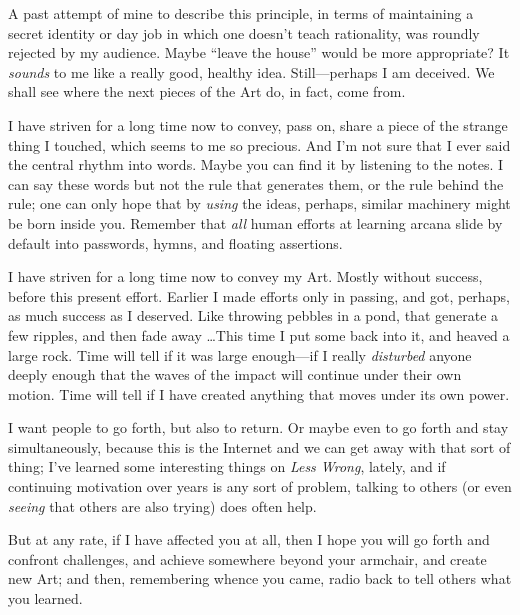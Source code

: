 {
 A past attempt of mine to describe this principle, in terms of
maintaining a secret identity or day job in which one
doesn't teach rationality, was roundly rejected by my
audience. Maybe ``leave the house''
would be more appropriate? It \textit{sounds} to me like a really good,
healthy idea. Still---perhaps I am deceived. We shall see where the
next pieces of the Art do, in fact, come from.}

{
 I have striven for a long time now to convey, pass on, share a
piece of the strange thing I touched, which seems to me so precious.
And I'm not sure that I ever said the central rhythm
into words. Maybe you can find it by listening to the notes. I can say
these words but not the rule that generates them, or the rule behind
the rule; one can only hope that by \textit{using} the ideas, perhaps,
similar machinery might be born inside you. Remember that \textit{all}
human efforts at learning arcana slide by default into passwords,
hymns, and floating assertions.}

{
 I have striven for a long time now to convey my Art. Mostly
without success, before this present effort. Earlier I made efforts
only in passing, and got, perhaps, as much success as I deserved. Like
throwing pebbles in a pond, that generate a few ripples, and then fade
away \ldots This time I put some back into it, and heaved a large rock.
Time will tell if it was large enough---if I really \textit{disturbed}
anyone deeply enough that the waves of the impact will continue under
their own motion. Time will tell if I have created anything that moves
under its own power.}

{
 I want people to go forth, but also to return. Or maybe even to go
forth and stay simultaneously, because this is the Internet and we can
get away with that sort of thing; I've learned some
interesting things on \textit{Less Wrong}, lately, and if continuing
motivation over years is any sort of problem, talking to others (or
even \textit{seeing} that others are also trying) does often help.}

{
 But at any rate, if I have affected you at all, then I hope you
will go forth and confront challenges, and achieve somewhere beyond
your armchair, and create new Art; and then, remembering whence you
came, radio back to tell others what you learned.}

\myendsectiontext


\bigskip



